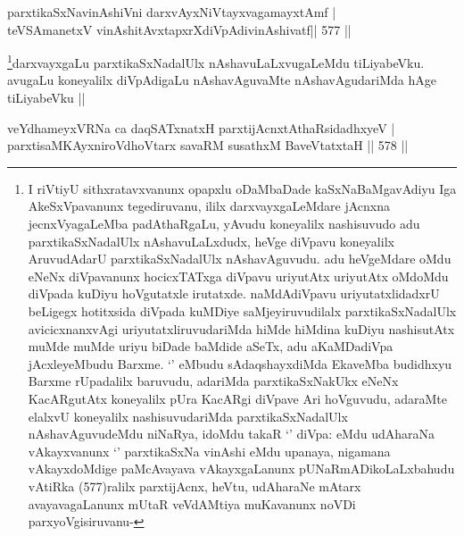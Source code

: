
\begin{shl}
parxtikaSxNavinAshiVni darxvAyxNiVtayxvagamayxtAmf | \\
teVSAmanetxV vinAshitAvxtapxrXdiVpAdivinAshivatf\hfill ||  577 ||  
\end{shl}

\begin{artha}
\footnote{I riVtiyU sithxratavxvanunx opapxlu oDaMbaDade kaSxNaBaMgavAdiyu Iga AkeSxVpavanunx tegediruvanu, ililx darxvayxgaLeMdare jAcnxna jecnxVyagaLeMba padAthaRgaLu, yAvudu koneyalilx nashisuvudo adu parxtikaSxNadalUlx nAshavuLaLxdudx, heVge diVpavu koneyalilx AruvudAdarU parxtikaSxNadalUlx nAshavAguvudu. adu heVgeMdare oMdu eNeNx diVpavanunx hocicxTATxga diVpavu uriyutAtx uriyutAtx oMdoMdu diVpada kuDiyu hoVgutatxle irutatxde. naMdAdiVpavu uriyutatxlidadxrU beLigegx hotitxsida diVpada kuMDiye saMjeyiruvudilalx parxtikaSxNadalUlx avicicxnanxvAgi uriyutatxliruvudariMda hiMde hiMdina kuDiyu nashisutAtx muMde muMde uriyu biDade baMdide aSeTx, adu aKaMDadiVpa jAcxleyeMbudu Barxme. `\stext' eMbudu sAdaqshayxdiMda EkaveMba budidhxyu Barxme rUpadalilx baruvudu, adariMda parxtikaSxNakUkx eNeNx KacARgutAtx koneyalilx pUra KacARgi diVpave Ari hoVguvudu, adaraMte elalxvU koneyalilx nashisuvudariMda parxtikaSxNadalUlx nAshavAguvudeMdu niNaRya, idoMdu takaR `\stext' diVpa: eMdu udAharaNa vAkayxvanunx `\stext' parxtikaSxNa vinAshi eMdu upanaya, nigamana vAkayxdoMdige paMcAvayava vAkayxgaLanunx pUNaRmADikoLaLxbahudu vAtiRka (577)ralilx parxtijAcnx, heVtu, udAharaNe mAtarx avayavagaLanunx mUtaR veVdAMtiya muKavanunx noVDi parxyoVgisiruvanu-}darxvayxgaLu parxtikaSxNadalUlx nAshavuLaLxvugaLeMdu tiLiyabeVku. avugaLu koneyalilx diVpAdigaLu nAshavAguvaMte nAshavAgudariMda hAge tiLiyabeVku ||
\end{artha}


\begin{shl}
veYdhameyxVRNa ca daqSATxnatxH parxtijAcnxtAthaRsidadhxyeV | \\
parxtisaMKAyxniroVdhoV\s tarx savaRM susathxM BaveVtatxtaH \hfill||  578 ||  
\end{shl}

